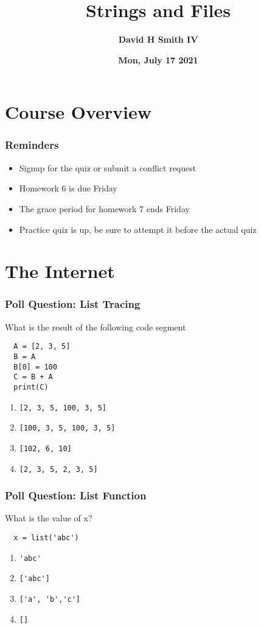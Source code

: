 \documentclass{beamer}
\title{\textbf{Strings and Files}}
\author{\textbf{David H Smith IV}}
\institute[\textbf{UIUC}]{\textbf{University of Illinois Urbana-Champaign}}
\date{\textbf{Mon, July 17 2021}}
\begin{document}
\frame{\titlepage}

\section{Course Overview}

%
%
\begin{frame}
  \frametitle{Reminders}
  \begin{itemize}
    \item Signup for the quiz or submit a conflict request
    \item Homework 6 is due Friday 
    \item The grace period for homework 7 ends Friday
    \item Practice quiz is up, be sure to attempt it before the actual quiz
  \end{itemize}
\end{frame}

\section{The Internet}

%
%
\begin{frame}[fragile]
  \frametitle{Poll Question: List Tracing}
  What is the result of the following code segment
  \begin{lstlisting}
  A = [2, 3, 5]
  B = A
  B[0] = 100
  C = B + A
  print(C)
  \end{lstlisting}
  \vfill
  \begin{enumerate}[A]
    \item \lstinline|[2, 3, 5, 100, 3, 5]|
    \item \lstinline|[100, 3, 5, 100, 3, 5]|
    \item \lstinline|[102, 6, 10]|
    \item \lstinline|[2, 3, 5, 2, 3, 5]|
  \end{enumerate}
\end{frame}

%
%
\begin{frame}[fragile]
  \frametitle{Poll Question: List Function}
  What is the value of x?
  \begin{lstlisting}
  x = list('abc')
  \end{lstlisting}
  \vfill
  \begin{enumerate}[A]
    \item \lstinline|'abc'|
    \item \lstinline|['abc']|
    \item \lstinline|['a', 'b','c']|
    \item \lstinline|[]|
  \end{enumerate}
\end{frame}
\end{document}
